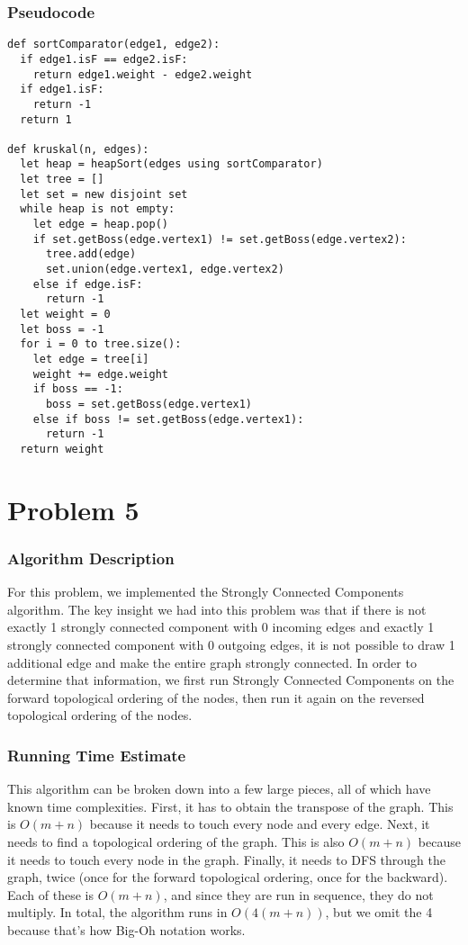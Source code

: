 \documentclass{math}
\begin{document}
\subsubsection*{Pseudocode}
\begin{lstlisting}
def sortComparator(edge1, edge2):
  if edge1.isF == edge2.isF:
    return edge1.weight - edge2.weight
  if edge1.isF:
    return -1
  return 1

def kruskal(n, edges):
  let heap = heapSort(edges using sortComparator)
  let tree = []
  let set = new disjoint set
  while heap is not empty:
    let edge = heap.pop()
    if set.getBoss(edge.vertex1) != set.getBoss(edge.vertex2):
      tree.add(edge)
      set.union(edge.vertex1, edge.vertex2)
    else if edge.isF:
      return -1
  let weight = 0
  let boss = -1
  for i = 0 to tree.size():
    let edge = tree[i]
    weight += edge.weight
    if boss == -1:
      boss = set.getBoss(edge.vertex1)
    else if boss != set.getBoss(edge.vertex1):
      return -1
  return weight
\end{lstlisting}

\section*{Problem 5}

\subsubsection*{Algorithm Description}
For this problem, we implemented the Strongly Connected Components algorithm.
The key insight we had into this problem was that if there is not exactly 1
strongly connected component with 0 incoming edges and exactly 1 strongly
connected component with 0 outgoing edges, it is not possible to draw 1
additional edge and make the entire graph strongly connected.  In order to
determine that information, we first run Strongly Connected Components on the
forward topological ordering of the nodes, then run it again on the reversed
topological ordering of the nodes.

\subsubsection*{Running Time Estimate}
This algorithm can be broken down into a few large pieces, all of which have
known time complexities. First, it has to obtain the transpose of the graph.
This is \( O(m+n) \) because it needs to touch every node and every edge. Next,
it needs to find a topological ordering of the graph. This is also \( O(m+n) \)
because it needs to touch every node in the graph. Finally, it needs to DFS
through the graph, twice (once for the forward topological ordering, once for
the backward). Each of these is \( O(m+n) \), and since they are run in
sequence, they do not multiply. In total, the algorithm runs in
\( O(4(m+n)) \), but we omit the 4 because that's how Big-Oh notation works.
\end{document}
